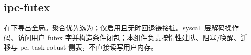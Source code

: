 
\subsection{ipc-futex}

在下导出全局。聚合优先选为；仅启用且无时回退链接桩。syscall 层解码操作码、访问用户 futex 字并构造条件闭包；本组件负责按惰性建队、阻塞/唤醒、迁移与 per-task robust 侧表，不直接读写用户内存。




